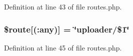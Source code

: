 Definition at line 43 of file routes.\+php.

\subsubsection[{\texorpdfstring{\$route}{$route}}]{\setlength{\rightskip}{0pt plus 5cm}\$route\mbox{[}\textquotesingle{}(\+:any)\textquotesingle{}\mbox{]} = \char`\"{}uploader/\$1\char`\"{}}\hypertarget{routes_8php_a4f4a60643ecf039e359f845247f5124d}{}\label{routes_8php_a4f4a60643ecf039e359f845247f5124d}


Definition at line 45 of file routes.\+php.

